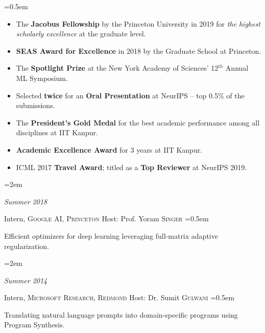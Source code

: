 \documentclass{scrartcl}
\newlength{\datebox}\settowidth{\datebox}{Spring 2011} %
\newcommand{\NewEntry}[3]{\noindent\hangindent=2em\hangafter=0 \parbox{\datebox}{\small \textit{#1}}\hspace{1.5em} #2 #3 %
\vspace{0.5em}} %
\newcommand{\Description}[1]{\hangindent=0.5em\hangafter=0\noindent\raggedright\footnotesize{#1}\par\normalsize\vspace{1em}} %
\begin{document}
\begin{cv}{}
\noindent{}

\Description{
\begin{itemize}
\item[\Forward] The \textbf{Jacobus Fellowship} by the Princeton University in 2019 for {\em the highest scholarly excellence} at the graduate level. 
\vspace{-0.2em}
\item[\Forward] \textbf{SEAS Award for Excellence} in 2018 by the Graduate School at Princeton.
\vspace{-0.2em}
\item[\Forward] The \textbf{Spotlight Prize} at the New York Academy of Sciences' 12$^{th}$ Annual ML Symposium.
\vspace{-0.2em}
\item[\Forward] Selected \textbf{twice} for an \textbf{Oral Presentation} at NeurIPS -- top 0.5\% of the submissions.
\vspace{-0.2em}
\item[\Forward] The \textbf{President's Gold Medal} for the best academic performance among all disciplines at IIT Kanpur.
\vspace{-0.2em}
\item[\Forward]\textbf{Academic Excellence Award} for 3 years at IIT Kanpur.
\vspace{-0.2em}
\item[\Forward] ICML 2017 \textbf{Travel Award}; titled as a \textbf{Top Reviewer} at NeurIPS 2019.
\end{itemize}
\vspace{-0.2em}
}

\noindent{}

\NewEntry{Summer 2018}{Intern, \textsc{\color{Maroon} Google AI, Princeton} \hfill {\footnotesize Host: Prof. Yoram \textsc{Singer}}}

\vspace{-0.4em}\hspace{1em}
\Description{Efficient optimizers for deep learning leveraging full-matrix adaptive regularization.}
\vspace{-0.5em}
\NewEntry{Summer 2014}{Intern, \textsc{\color{Maroon} Microsoft Research, Redmond} \hfill {\footnotesize Host: Dr. Sumit \textsc{Gulwani}}}

\vspace{-0.4em}\hspace{1em}
\Description{Translating natural language prompts into domain-specific programs using Program Synthesis.}




\end{cv}
\end{document}
